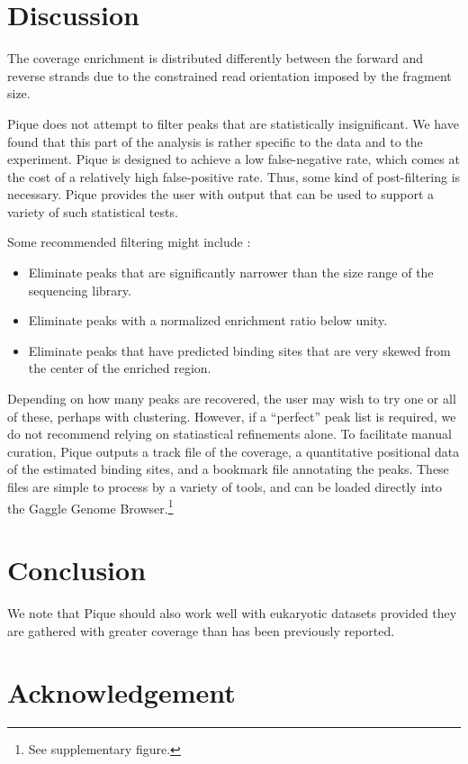 \documentclass{bioinfo}
\begin{document}
\section{Discussion}

The coverage enrichment is distributed differently between the forward
and reverse strands due to the constrained read orientation imposed by
the fragment size.

Pique does not attempt to filter peaks that are statistically
insignificant. We have found that this part of the analysis is rather
specific to the data and to the experiment. Pique is designed to
achieve a low false-negative rate, which comes at the cost of a
relatively high false-positive rate. Thus, some kind of post-filtering
is necessary. Pique provides the user with output that can be used to
support a variety of such statistical tests.

Some recommended filtering might include :

\begin{itemize}
\item Eliminate peaks that are significantly narrower than the size
  range of the sequencing library.
\item Eliminate peaks with a normalized enrichment ratio below unity.
\item Eliminate peaks that have predicted binding sites that are very
  skewed from the center of the enriched region.
\end{itemize}

Depending on how many peaks are recovered, the user may wish to try
one or all of these, perhaps with clustering. However, if a
``perfect'' peak list is required, we do not recommend relying on
statiastical refinements alone. To facilitate manual curation, Pique
outputs a track file of the coverage, a quantitative positional data
of the estimated binding sites, and a bookmark file annotating the
peaks. These files are simple to process by a variety of tools, and
can be loaded directly into the Gaggle Genome Browser.\footnote{See
  supplementary figure.}

\section{Conclusion}

We note that Pique should also work well with eukaryotic datasets
provided they are gathered with greater coverage than has been
previously reported.

\section*{Acknowledgement}
\end{document}
